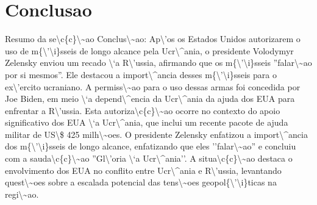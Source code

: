 \documentclass{article}%
\begin{document}
\section{Conclusao}%
\label{sec:Conclusao}%
Resumo da se\textbackslash{}c\{c\}\textbackslash{}\textasciitilde{}ao Conclus\textbackslash{}\textasciitilde{}ao:\newline%
\newline%
Ap\textbackslash{}'os os Estados Unidos autorizarem o uso de m\{\textbackslash{}'\textbackslash{}i\}sseis de longo alcance pela Ucr\textbackslash{}\^{}ania, o presidente Volodymyr Zelensky enviou um recado \textbackslash{}`a R\textbackslash{}'ussia, afirmando que os m\{\textbackslash{}'\textbackslash{}i\}sseis ''falar\textbackslash{}\textasciitilde{}ao por si mesmos''. Ele destacou a import\textbackslash{}\^{}ancia desses m\{\textbackslash{}'\textbackslash{}i\}sseis para o ex\textbackslash{}'ercito ucraniano. A permiss\textbackslash{}\textasciitilde{}ao para o uso dessas armas foi concedida por Joe Biden, em meio \textbackslash{}`a depend\textbackslash{}\^{}encia da Ucr\textbackslash{}\^{}ania da ajuda dos EUA para enfrentar a R\textbackslash{}'ussia. Esta autoriza\textbackslash{}c\{c\}\textbackslash{}\textasciitilde{}ao ocorre no contexto do apoio significativo dos EUA \textbackslash{}`a Ucr\textbackslash{}\^{}ania, que inclui um recente pacote de ajuda militar de US\textbackslash{}\$ 425 milh\textbackslash{}\textasciitilde{}oes. O presidente Zelensky enfatizou a import\textbackslash{}\^{}ancia dos m\{\textbackslash{}'\textbackslash{}i\}sseis de longo alcance, enfatizando que eles ''falar\textbackslash{}\textasciitilde{}ao'' e concluiu com a sauda\textbackslash{}c\{c\}\textbackslash{}\textasciitilde{}ao ''Gl\textbackslash{}'oria \textbackslash{}`a Ucr\textbackslash{}\^{}ania''. A situa\textbackslash{}c\{c\}\textbackslash{}\textasciitilde{}ao destaca o envolvimento dos EUA no conflito entre Ucr\textbackslash{}\^{}ania e R\textbackslash{}'ussia, levantando quest\textbackslash{}\textasciitilde{}oes sobre a escalada potencial das tens\textbackslash{}\textasciitilde{}oes geopol\{\textbackslash{}'\textbackslash{}i\}ticas na regi\textbackslash{}\textasciitilde{}ao.

%
\end{document}
